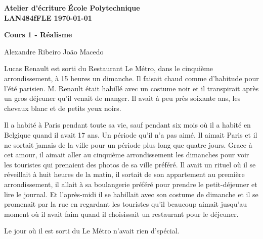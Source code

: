\documentclass[10pt]{article} %
\newcommand{\createHeader}[5]{
	\noindent
	\normalsize\textbf{#2} \hfill \textbf{#1}\\
	\normalsize\textbf{#3} \hfill \textbf{\today}\vspace{20pt}
	\centerline{\Large \textbf{#5}}\vspace{3pt}
	\centerline{\normalsize #4}\vspace{20pt}}
\begin{document}
\createHeader{École Polytechnique}{Atelier d'écriture}{LAN484fFLE}{Alexandre Ribeiro João Macedo}{Cours 1 - Réalisme}

Lucas Renault est sorti du Restaurant Le Métro, dans le cinquième arrondissement, à 15 heures un dimanche. Il faisait chaud comme d'habitude pour l'été parisien. M. Renault était habillé avec un costume noir et il transpirait après un gros déjeuner qu'il venait de manger. Il avait à peu près soixante ans, les chevaux blanc et de petits yeux noirs. 

Il a habité à Paris pendant toute sa vie, sauf pendant six mois où il a habité en Belgique quand il avait 17 ans. Un période qu'il n'a pas aimé. Il aimait Paris et il ne sortait jamais de la ville pour un période plus long que quatre jours. Grace à cet amour, il aimait aller au cinquième arrondissement les dimanches pour voir les touristes qui prenaient des photos de sa ville préféré. Il avait un rituel où il se réveillait à huit heures de la matin, il sortait de son appartement au première arrondissement, il allait à sa boulangerie préféré pour prendre le petit-déjeuner et lire le journal. Et l'après-midi il se habillait avec son costume de dimanche et il se promenait par la rue en regardant les touristes qu'il beaucoup aimait jusqu'au moment où il avait faim quand il choisissait un restaurant pour le déjeuner.

Le jour où il est sorti du Le Métro n'avait rien d'spécial.
\end{document}

